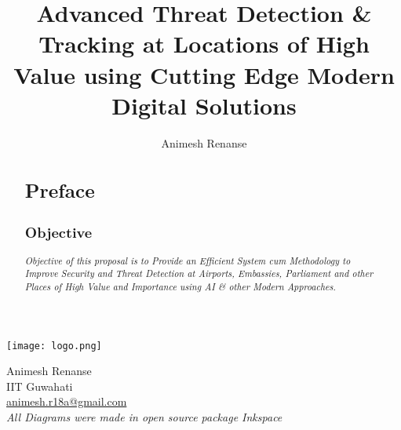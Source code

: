 \documentclass[a4paper,11pt]{article}
\title{{Advanced Threat Detection \& Tracking at Locations of High Value using Cutting Edge Modern Digital Solutions}}
\author{Animesh Renanse}
\begin{document}
\begin{titlepage}
    \centering
    \maketitle
    \thispagestyle{empty}   %
    \texttt{[image: logo.png]}
    \vfill
    {\raggedright
    Animesh Renanse\\
    IIT Guwahati\\
    \href{mailto:animesh.r18a@gmail.com}{animesh.r18a@gmail.com}\\
    \textit{All Diagrams were made in open source package Inkspace}\\
    }
\end{titlepage}

\begin{abstract}
\section{\textbf{Preface}}
\subsection{Objective} 
\textit{Objective of this proposal is to Provide an Efficient System cum Methodology to Improve Security and Threat Detection at Airports, Embassies, Parliament and other Places of High Value and Importance using AI \& other Modern Approaches.}
\newline


\end{abstract}
\end{document}
